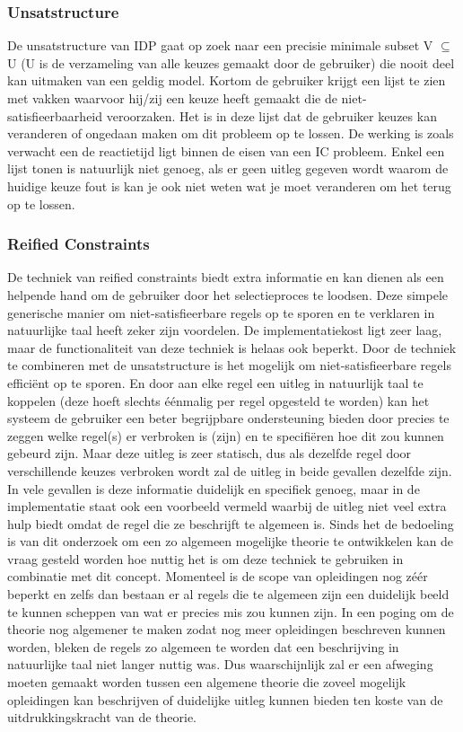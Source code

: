 \subsubsection{Unsatstructure}
De unsatstructure van IDP gaat op zoek naar een precisie minimale subset V $\subseteq$ U  (U is de verzameling van alle keuzes gemaakt door de gebruiker) die nooit deel kan uitmaken van een geldig model. Kortom de gebruiker krijgt een lijst te zien met vakken waarvoor hij/zij een keuze heeft gemaakt die de niet-satisfieerbaarheid veroorzaken. Het is in deze lijst dat de gebruiker keuzes kan veranderen of ongedaan maken om dit probleem op te lossen. De werking is zoals verwacht een de reactietijd ligt binnen de eisen van een IC probleem. Enkel een lijst tonen is natuurlijk niet genoeg, als er geen uitleg gegeven wordt waarom de huidige keuze fout is kan je ook niet weten wat je moet veranderen om het terug op te lossen. 

\subsubsection{Reified Constraints}
De techniek van reified constraints biedt extra informatie en kan dienen als een helpende hand om de gebruiker door het selectieproces te loodsen. Deze simpele generische manier om niet-satisfieerbare regels op te sporen en te verklaren in natuurlijke taal heeft zeker zijn voordelen. De implementatiekost ligt zeer laag, maar de functionaliteit van deze techniek is helaas ook beperkt. Door de techniek te combineren met de unsatstructure is het mogelijk om niet-satisfieerbare regels effici\"{e}nt op te sporen. En door aan elke regel een uitleg in natuurlijk taal te koppelen (deze hoeft slechts \'{e}\'{e}nmalig per regel opgesteld te worden) kan het systeem de gebruiker een beter begrijpbare ondersteuning bieden door precies te zeggen welke regel(s) er verbroken is (zijn) en te specifi\"{e}ren hoe dit zou kunnen gebeurd zijn. Maar deze uitleg is zeer statisch, dus als dezelfde regel door verschillende keuzes verbroken wordt zal de uitleg in beide gevallen dezelfde zijn. In vele gevallen is deze informatie duidelijk en specifiek genoeg, maar in de implementatie staat ook een voorbeeld vermeld waarbij de uitleg niet veel extra hulp biedt omdat de regel die ze beschrijft te algemeen is. Sinds het de bedoeling is van dit onderzoek om een zo algemeen mogelijke theorie te ontwikkelen kan de vraag gesteld worden hoe nuttig het is om deze techniek te gebruiken in combinatie met dit concept. Momenteel is de scope van opleidingen nog z\'{e}\'{e}r beperkt en zelfs dan bestaan er al regels die te algemeen zijn een duidelijk beeld te kunnen scheppen van wat er precies mis zou kunnen zijn. In een poging om de theorie nog algemener te maken zodat nog meer opleidingen beschreven kunnen worden, bleken de regels zo algemeen te worden dat een beschrijving in natuurlijke taal niet langer nuttig was. Dus waarschijnlijk zal er een afweging moeten gemaakt worden tussen een algemene theorie die zoveel mogelijk opleidingen kan beschrijven of duidelijke uitleg kunnen bieden ten koste van de uitdrukkingskracht van de theorie.

